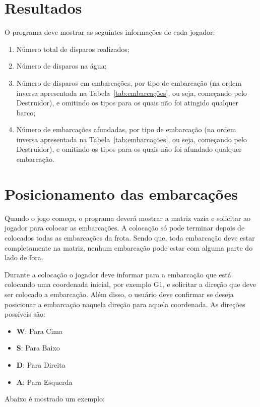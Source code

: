\documentclass[defesa,oneside]{ppginf}
\begin{document}
\section{Resultados}

O programa deve mostrar as seguintes informações de cada jogador:

\begin{enumerate}
	\item Número total de disparos realizados;
	\item Número de disparos na água;
	\item Número de disparos em embarcações, por tipo de embarcação (na ordem inversa apresentada na Tabela~\ref{tab:embarcações}, ou seja, começando pelo Destruidor), e omitindo os tipos para os quais não foi atingido qualquer barco;
	\item Número de embarcações afundadas, por tipo de embarcação (na ordem inversa apresentada na Tabela~\ref{tab:embarcações}, ou seja, começando pelo Destruidor), e omitindo os tipos para os quais não foi afundado qualquer embarcação.
\end{enumerate}

\section{Posicionamento das embarcações}

Quando o jogo começa, o programa deverá mostrar a matriz vazia e solicitar ao jogador para colocar as embarcações. A colocação só pode terminar depois de colocados todas as embarcações da frota. Sendo que, toda embarcação deve estar completamente na matriz, nenhum embarcação pode estar com alguma parte do lado de fora.

Durante a colocação o jogador deve informar para a embarcação que está colocando uma coordenada inicial, por exemplo G1, e solicitar a direção que deve ser colocado a embarcação. Além disso, o usuário deve confirmar se deseja posicionar a embarcação naquela direção para aquela coordenada. As direções possíveis são:

\begin{itemize}
	\item \textbf{W}: Para Cima
	\item \textbf{S}: Para Baixo
	\item \textbf{D}: Para Direita
	\item \textbf{A}: Para Esquerda
\end{itemize}

Abaixo é mostrado um exemplo:
\end{document}
